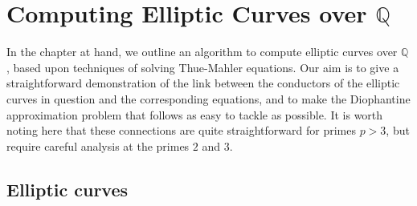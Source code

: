 \documentclass[11pt]{report}
\theoremstyle{definition}
\begin{document}

\chapter{Computing Elliptic Curves over $\mathbb{Q}$}
\label{cha:comp-ellipt-curv}

In the chapter at hand, we outline an algorithm to compute elliptic curves over $\mathbb{Q}$, based upon techniques of solving Thue-Mahler equations. Our aim is to give a straightforward demonstration of the link
between the conductors of the elliptic curves in question and the corresponding equations, and to make the Diophantine approximation problem
that follows as easy to tackle as possible. It is worth noting here that these connections are quite straightforward for primes $p > 3$, but require
careful analysis at the primes $2$ and $3$.



\section{Elliptic curves}
\label{sec:elliptic-curves}
\end{document}
